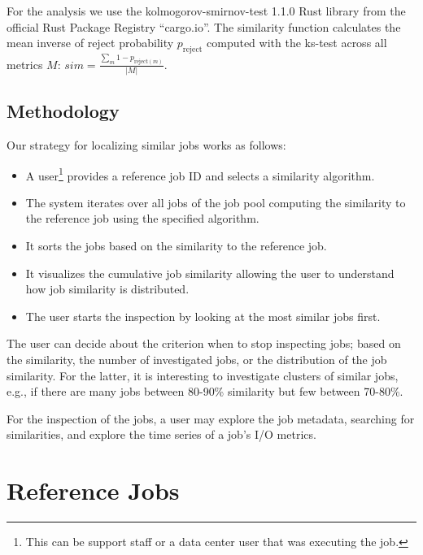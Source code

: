 \documentclass{jhps}
\begin{document}

For the analysis we use the kolmogorov-smirnov-test 1.1.0 Rust library from the official Rust Package Registry ``cargo.io''.
The similarity function calculates the mean inverse of reject probability $p_{\text{reject}}$ computed with the ks-test across all metrics $M$: $sim = \frac{\sum_m 1 - p_{\text{reject}(m)}}{|M|}$.





\subsection{Methodology}
Our strategy for localizing similar jobs works as follows:
\begin{itemize}
  \item A user\footnote{This can be support staff or a data center user that was executing the job.} provides a reference job ID and selects a similarity algorithm.
  \item The system iterates over all jobs of the job pool computing the similarity to the reference job using the specified algorithm.
  \item It sorts the jobs based on the similarity to the reference job.
  \item It visualizes the cumulative job similarity allowing the user to understand how job similarity is distributed.
  \item The user starts the inspection by looking at the most similar jobs first.
\end{itemize}
The user can decide about the criterion when to stop inspecting jobs; based on the similarity, the number of investigated jobs, or the distribution of the job similarity.
For the latter, it is interesting to investigate clusters of similar jobs, e.g., if there are many jobs between 80-90\% similarity but few between 70-80\%.

For the inspection of the jobs, a user may explore the job metadata, searching for similarities, and explore the time series of a job's I/O metrics.

\section{Reference Jobs}%
\label{sec:refjobs}
\end{document}
